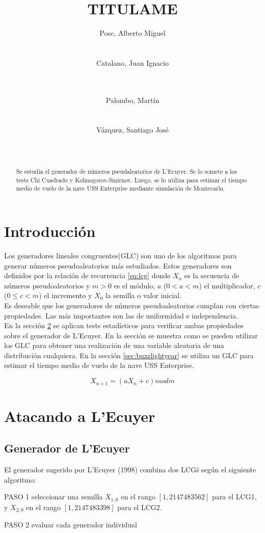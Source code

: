 \documentclass{sig-alternate}
\title{TITULAME}
\author{
\alignauthor
Pose, Alberto Miguel\\
       \affaddr{Instituto Tecnol\'ogico de Buenos Aires}\\
       \affaddr{Buenos Aires, Argentina}\\
       \email{apose@alu.itba.edu.ar}
\alignauthor
Catalano, Juan Ignacio\\
       \affaddr{Instituto Tecnol\'ogico de Buenos Aires}\\
       \affaddr{Buenos Aires, Argentina}\\
       \email{jcatalan@alu.itba.edu.ar}
\and
\alignauthor 
Palombo, Mart\'in\\
       \affaddr{Instituto Tecnol\'ogico de Buenos Aires}\\
       \affaddr{Buenos Aires, Argentina}\\
       \email{mpalombo@alu.itba.edu.ar}
\alignauthor 
V\'azquez, Santiago Jos\'e\\
       \affaddr{Instituto Tecnol\'ogico de Buenos Aires}\\
       \affaddr{Buenos Aires, Argentina}\\
       \email{savazque@alu.itba.edu.ar}
}
\date{}
\begin{document}
\maketitle

\begin{abstract}
Se estudia el generador de n\'umeros pseudaleatorios de L'Ecuyer.
Se lo somete a los tests Chi Cuadrado y Kolmogorov-Smirnov.
Luego, se lo utiliza para estimar el tiempo medio de vuelo de
la nave USS Enterprise mediante simulaci\'on de Montecarlo.
\end{abstract} 

\newpage

\section{Introducci\'on}
Los generadores lineales congruentes(GLC) son uno de los algoritmos
para generar n\'umeros pseudoaleatorios m\'as estudiados.
Estos generadores son definidos por la relaci\'on de recurrencia
\eqref{eq:lcg} donde $X_n$ es la secuencia de n\'umeros pseudoaleatorios y
 $m > 0$ es el m\'odulo, $a$ ($ 0 < a < m$) el multiplicador, $c$ ($0 \leq c < m$)
el incremento y $X_0$ la semilla o valor inicial. \\

Es deseable que los generadores de n\'umeros pseudoaleatorios cumplan
con ciertas propiedades. Las m\'as importantes son las de uniformidad
e independencia. \\

En la secci\'on \ref{sec:goingdown} se aplican tests estad\'isticos para
verificar ambas propiedades sobre el generador de L'Ecuyer. En la secci\'on
\label{sec:triangle} se muestra como se pueden utilizar los GLC para obtener
una realizaci\'on de una variable aleatoria de una distribuci\'on cualquiera.
En la secci\'on \ref{sec:buzzlightyear} se utiliza un GLC para estimar el
tiempo medio de vuelo de la nave USS Enterprise.

\begin{equation}
\label{eq:lcg}
X_{n+1} = (aX_{n}+c) mod m
\end{equation}

\section{Atacando a L'Ecuyer}
\label{sec:goingdown}

\subsection{Generador de L'Ecuyer}
\label{sec:ecuyer_intro}
El generador sugerido por L'Ecuyer (1998) combina dos LCG\'s seg\'un el
siguiente algoritmo:
\par PASO 1 seleccionar una semilla $X_{1,0}$ en el rango $[1,2147483562]$ para el 
LCG1, y $X_{2,0}$ en el rango $[1,2147483398]$ para el LCG2.
\par PASO 2 evaluar cada generador individual
\end{document}
